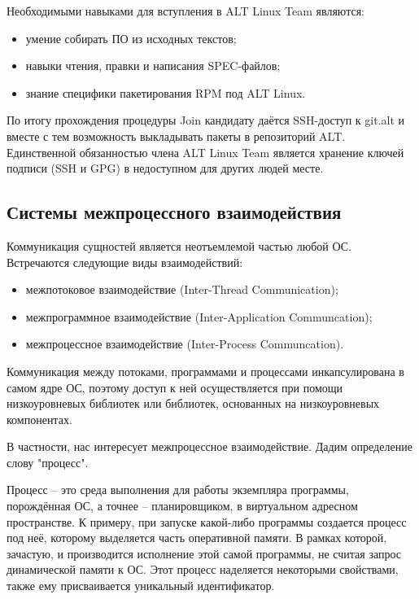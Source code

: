 \documentclass[bachelor, och, pract]{SCWorks}
\begin{document}
Необходимыми навыками для вступления в ALT Linux Team являются:
\begin{itemize}
    \item умение собирать ПО из исходных текстов;
    \item навыки чтения, правки и написания SPEC-файлов;
    \item знание специфики пакетирования RPM под ALT Linux.
\end{itemize}

По итогу прохождения процедуры Join кандидату даётся SSH-доступ к git.alt и вместе с тем возможность выкладывать пакеты в репозиторий ALT.
Единственной обязанностью члена ALT Linux Team является хранение ключей подписи (SSH и GPG) в недоступном для других людей месте\cite{a_join}.

\subsection{Системы межпроцессного взаимодействия}

Коммуникация сущностей является неотъемлемой частью любой ОС.
Встречаются следующие виды взаимодействий:

\begin{itemize}
    \item межпотоковое взаимодействие (Inter-Thread Communication);
    \item межпрограммное взаимодействие (Inter-Application Communcation);
    \item межпроцессное взаимодействие (Inter-Process Communcation).
\end{itemize}

Коммуникация между потоками, программами и процессами инкапсулирована в самом ядре ОС, поэтому доступ к ней осуществляется при помощи низкоуровневых библиотек или библиотек, основанных на низкоуровневых компонентах.

В частности, нас интересует межпроцессное взаимодействие. Дадим определение слову "процесс".

Процесс -- это среда выполнения для работы экземпляра программы, порождённая ОС, а точнее -- планировщиком, в виртуальном адресном пространстве.
К примеру, при запуске какой-либо программы создается процесс под неё, которому выделяется часть оперативной памяти.
В рамках которой, зачастую, и производится исполнение этой самой программы, не считая запрос динамической памяти к ОС.
Этот процесс наделяется некоторыми свойствами, также ему присваивается уникальный идентификатор.
\end{document}
